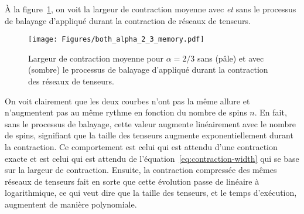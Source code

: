 À la figure~\ref{fig:alpha066_both_memory_curves}, on voit la largeur de contraction moyenne avec \emph{et} sans le processus de balayage d'appliqué durant la contraction de réseaux de tenseurs.
\begin{figure}[ht]
    \centering
    \texttt{[image: Figures/both\_alpha\_2\_3\_memory.pdf]}
    \caption{Largeur de contraction moyenne pour $\alpha = 2/3$ sans (pâle) et avec (sombre) le processus de balayage d'appliqué durant la contraction des réseaux de tenseurs.}
    \label{fig:alpha066_both_memory_curves}
\end{figure}
On voit clairement que les deux courbes n'ont pas la même allure et n'augmentent pas au même rythme en fonction du nombre de spins $n$.
En fait, sans le processus de balayage, cette valeur augmente linéairement avec le nombre de spins, signifiant que la taille des tenseurs augmente exponentiellement durant la contraction.
Ce comportement est celui qui est attendu d'une contraction exacte et est celui qui est attendu de l'équation~\ref{eq:contraction-width} qui se base sur la largeur de contraction.
Ensuite, la contraction compressée des mêmes réseaux de tenseurs fait en sorte que cette évolution passe de linéaire à logarithmique, ce qui veut dire que la taille des tenseurs, et le temps d'exécution, augmentent de manière polynomiale.

